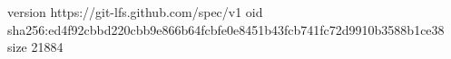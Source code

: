 version https://git-lfs.github.com/spec/v1
oid sha256:ed4f92cbbd220cbb9e866b64fcbfe0e8451b43fcb741fc72d9910b3588b1ce38
size 21884
